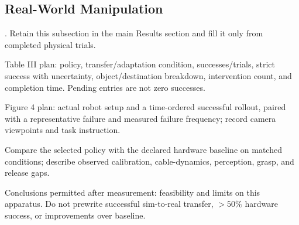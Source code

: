 \subsection{Real-World Manipulation}\label{sec:hardware_results}
\begin{outline}
\item {}. Retain this subsection in the main Results section and fill it only from completed physical trials.
\item Table III plan: policy, transfer/adaptation condition, successes/trials, strict success with uncertainty, object/destination breakdown, intervention count, and completion time. Pending entries are not zero successes.
\item Figure 4 plan: actual robot setup and a time-ordered successful rollout, paired with a representative failure and measured failure frequency; record camera viewpoints and task instruction.
\item Compare the selected policy with the declared hardware baseline on matched conditions; describe observed calibration, cable-dynamics, perception, grasp, and release gaps.
\item Conclusions permitted after measurement: feasibility and limits on this apparatus. Do not prewrite successful sim-to-real transfer, $>50\%$ hardware success, or improvements over baseline.
\end{outline}
